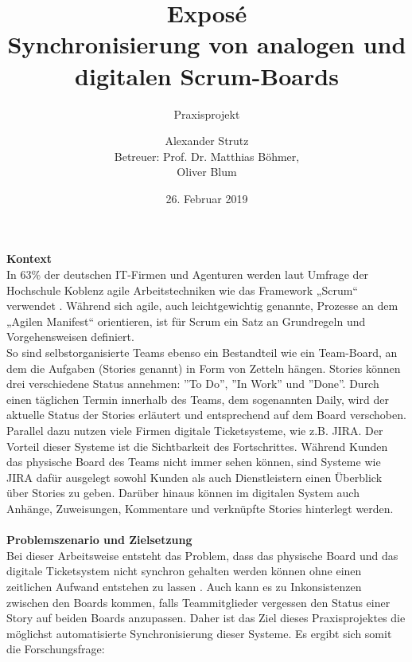 \documentclass[12pt,titlepage]{scrartcl}
\begin{document}
	\begin{titlepage}
		\title{Exposé \\ \glqq Synchronisierung von analogen und digitalen Scrum-Boards\grqq{}} 
		\subtitle{Praxisprojekt}
		\author{Alexander Strutz \vspace{0.5cm}\\ Betreuer: 
		Prof. Dr. Matthias Böhmer,\\Oliver Blum}
 		\date{26. Februar 2019}
		\maketitle
	\end{titlepage}
	\newpage
	\noindent \textbf{Kontext} \\
	In 63\% der deutschen IT-Firmen und Agenturen werden laut Umfrage der Hochschule Koblenz agile Arbeitstechniken wie das Framework „Scrum“ verwendet \cite{hskob}. Während sich agile, auch leichtgewichtig genannte, Prozesse an dem „Agilen Manifest“ orientieren, ist für Scrum ein Satz an Grundregeln und Vorgehensweisen definiert. \\
So sind selbstorganisierte Teams ebenso ein Bestandteil wie ein Team-Board, an dem die Aufgaben (Stories genannt) in Form von Zetteln hängen. Stories können drei verschiedene Status annehmen: ''To Do'', ''In Work'' und ''Done''. Durch einen täglichen Termin innerhalb des Teams, dem sogenannten Daily, wird der aktuelle Status der Stories erläutert und entsprechend auf dem Board verschoben. \\
Parallel dazu nutzen viele Firmen digitale Ticketsysteme, wie z.B. JIRA. Der Vorteil dieser Systeme ist die Sichtbarkeit des Fortschrittes. Während Kunden das physische Board des Teams nicht immer sehen können, sind Systeme wie JIRA dafür ausgelegt sowohl Kunden als auch Dienstleistern einen Überblick über Stories zu geben. Darüber hinaus können im digitalen System auch Anhänge, Zuweisungen, Kommentare und verknüpfte Stories hinterlegt werden. \\ \\
\textbf{Problemszenario und Zielsetzung} \\
Bei dieser Arbeitsweise entsteht das Problem, dass das physische Board und das digitale Ticketsystem nicht synchron gehalten werden können ohne einen zeitlichen Aufwand entstehen zu lassen \cite{sync}. Auch kann es zu Inkonsistenzen zwischen den Boards kommen, falls Teammitglieder vergessen den Status einer Story auf beiden Boards anzupassen. Daher ist das Ziel dieses Praxisprojektes die möglichst automatisierte Synchronisierung dieser Systeme. Es ergibt sich somit die Forschungsfrage: \\
\end{document}
